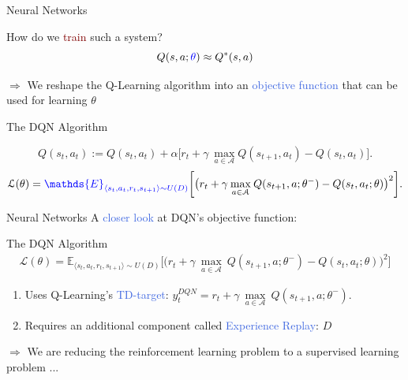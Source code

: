 \documentclass{beamer}
\begin{document}
\begin{frame}{Neural Networks}
	\begin{center}
		How do we \textcolor{Maroon}{train} such a system?
		\begin{equation*}  
			Q(s,a; \textcolor{blue}{\theta})\approx Q^{*}(s,a)
		\end{equation*}
	\end{center}

	$\Rightarrow$ We reshape the Q-Learning algorithm into an \textcolor{RoyalBlue}{objective function} that can be used for learning $\theta$

	\begin{block}{The DQN Algorithm}
		
		\begin{equation*}
			Q(s_t,a_t):=Q(s_t,a_t) + \alpha\big[r_t + \gamma \:\underset{a\in \mathcal{A}}{\max} Q(s_{t+1},a_t) - Q(s_t, a_t) \big].
			\label{eq:q_learning}
		\end{equation*}
		\begin{multline*}
			\mathcal{L}(\theta) = \textcolor{blue}{\mathds{E}_{\langle s_{t},a_{t},r_{t},s_{t+1}\rangle\sim U(D)}} \bigg[\big(r_{t} + \gamma \: \underset{a\in \mathcal{A}}{\max}\: Q(s_{t+1}, a; \theta^{-}) - Q(s_{t}, a_{t}; \theta)\big)^{2}\bigg].
		\end{multline*}
	\end{block}

\end{frame}

\begin{frame}{Neural Networks}
	A \textcolor{RoyalBlue}{closer look} at DQN's objective function:
	\begin{block}{The DQN Algorithm}
	\begin{multline*}
		\mathcal{L}(\theta) = \mathds{E}_{\langle s_{t},a_{t},r_{t},s_{t+1}\rangle\sim U(D)} \bigg[\big(r_{t} + \gamma \: \underset{a\in \mathcal{A}}{\max}\: Q(s_{t+1}, a; \theta^{-}) - Q(s_{t}, a_{t}; \theta)\big)^{2}\bigg]
	\end{multline*}
	\end{block}
	
	\bigskip

	\begin{enumerate}
		\item Uses Q-Learning's \textcolor{RoyalBlue}{TD-target}: $y^{DQN}_{t} = r_{t} + \gamma \: \underset{a\in \mathcal{A}}{\max}\: Q(s_{t+1}, a; \theta^{-})$. 
		\item Requires an additional component called \textcolor{RoyalBlue}{Experience Replay}: $D$
	\end{enumerate}

	\bigskip

	$\Rightarrow$ We are reducing the reinforcement learning problem to a supervised learning problem ...
\end{frame}
\end{document}

